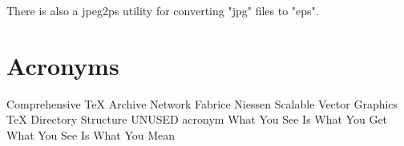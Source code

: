 \documentclass{boostreport}
\begin{document}
There is also a jpeg2ps utility for converting "jpg" files to "eps".


\section{Acronyms}
\label{sec:acronyms}


\begin{boostnormalspacing}
\begin{acronym}[WYSIWYMX]
        {Comprehensive \TeX{} Archive Network}
         {Fabrice Niessen}
         {Scalable Vector Graphics}
         {\TeX{} Directory Structure}
      {UNUSED acronym}
     {What You See Is What You Get}
     {What You See Is What You Mean}
\end{acronym}
\end{boostnormalspacing}
\end{document}

